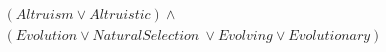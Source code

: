 \documentclass[a4paper]{book}
\begin{document}









			\begin{center}
			\begin{multline}
			\label{eq:search2}
			(Altruism \lor Altruistic ) \land \\
				(Evolution \lor Natural Selection\ \lor Evolving \lor Evolutionary)
				\end{multline}
				\end{center}
\end{document}
